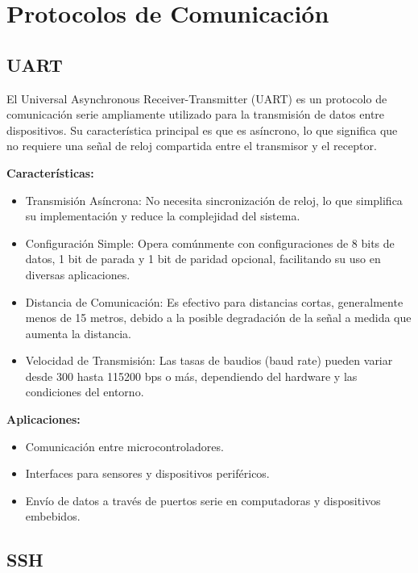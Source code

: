 \section{Protocolos de Comunicación}\label{sec:protocolos_de_comunicacion}

\subsection{UART}

El Universal Asynchronous Receiver-Transmitter (UART) es un protocolo de comunicación serie ampliamente utilizado para la transmisión de datos entre dispositivos. Su característica principal es que es asíncrono, lo que significa que no requiere una señal de reloj compartida entre el transmisor y el receptor.

\textbf{Características:}

\begin{itemize}
    \item Transmisión Asíncrona: No necesita sincronización de reloj, lo que simplifica su implementación y reduce la complejidad del sistema.
    \item Configuración Simple: Opera comúnmente con configuraciones de 8 bits de datos, 1 bit de parada y 1 bit de paridad opcional, facilitando su uso en diversas aplicaciones.
    \item Distancia de Comunicación: Es efectivo para distancias cortas, generalmente menos de 15 metros, debido a la posible degradación de la señal a medida que aumenta la distancia.
    \item Velocidad de Transmisión: Las tasas de baudios (baud rate) pueden variar desde 300 hasta 115200 bps o más, dependiendo del hardware y las condiciones del entorno.
\end{itemize}

\textbf{Aplicaciones:}

\begin{itemize}
    \item Comunicación entre microcontroladores.
    \item Interfaces para sensores y dispositivos periféricos.
    \item Envío de datos a través de puertos serie en computadoras y dispositivos embebidos.
\end{itemize}

\subsection{SSH}

